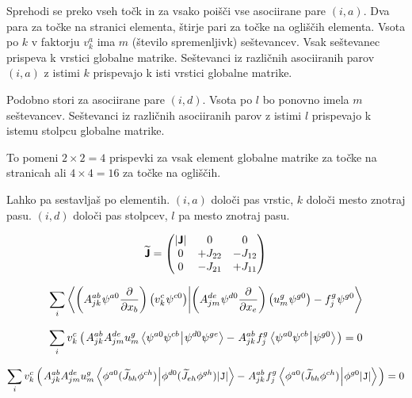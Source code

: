 Sprehodi se preko vseh točk in za vsako poišči vse asociirane pare $(i, a)$. Dva para za točke na stranici elementa, štirje pari za točke na ogliščih elementa. Vsota po $k$ v faktorju $v^a_k$ ima $m$ (število spremenljivk) seštevancev. Vsak seštevanec prispeva k vrstici globalne matrike. Seštevanci iz različnih asociiranih parov $(i, a)$ z istimi $k$ prispevajo k isti vrstici globalne matrike.

Podobno stori za asociirane pare $(i, d)$. Vsota po $l$ bo ponovno imela $m$ seštevancev. Seštevanci iz različnih asociiranih parov z istimi $l$ prispevajo k istemu stolpcu globalne matrike.

To pomeni \(2 \times 2 = 4\) prispevki za vsak element globalne matrike za točke na stranicah ali $4 \times 4 = 16$ za točke na ogliščih.

Lahko pa sestavljaš po elementih. $(i, a)$ določi pas vrstic, $k$ določi mesto znotraj pasu. $(i, d)$ določi pas stolpcev, $l$ pa mesto znotraj pasu.

\begin{equation}
   \bm{\mathsf{\widetilde{J}}}
   =
   \begin{pmatrix}
      |\bm{\mathsf{J}}| & 0 & 0 \\
      0 & +J_{22} & -J_{12} \\
      0 & -J_{21} & +J_{11}
   \end{pmatrix}
\end{equation}


\begin{equation}
   \sum_i \bra{\left(A^{ab}_{jk} \mkern1mu \psi^{a0} \frac{\partial}{\partial x_b}\right) \left(v^c_k \mkern1mu \psi^{c0}\right)}\ket{\left(A^{de}_{jm} \mkern1mu \psi^{d0} \frac{\partial}{\partial x_e}\right) \left(u^g_m \mkern1mu \psi^{g0}\right) - f^g_j \mkern1mu \psi^{g0}}
\end{equation}

\begin{equation}
   \sum_i v^c_k \left( \mkern2mu A^{ab}_{jk} A^{de}_{jm} u^g_m \bra{\psi^{a0} \psi^{cb} \mkern1mu}\ket{\mkern1mu \psi^{d0} \psi^{ge}} - \mkern1mu A^{ab}_{jk} \mkern1mu f^g_j \bra{\psi^{a0} \psi^{cb} \mkern1mu}\ket{\mkern1mu \psi^{g0}} \mkern2mu \right) = 0
\end{equation}

\begin{equation}
   \sum_i v^c_k \left( \mkern2mu A^{ab}_{jk} A^{de}_{jm} u^g_m \bra{\phi^{a0} (\widetilde{J}_{bh}  \phi^{ch}) \mkern1mu}\ket{\mkern1mu \phi^{d0} (\widetilde{J}_{eh}  \phi^{gh}) |\texttt{J}|} - \mkern1mu A^{ab}_{jk} \mkern1mu f^g_j \bra{\phi^{a0} (\widetilde{J}_{bh}  \phi^{ch}) \mkern1mu}\ket{\mkern1mu \phi^{g0} |\texttt{J}|} \mkern2mu \right) = 0
\end{equation}

